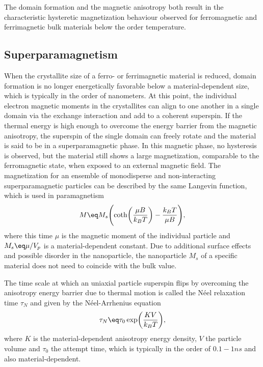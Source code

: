 \documentclass[\main/dresen_thesis.tex]{subfiles}
\begin{document}
    The domain formation and the magnetic anisotropy both result in the characteristic hysteretic magnetization behaviour observed for ferromagnetic and ferrimagnetic bulk materials below the order temperature.

  \subsection{Superparamagnetism}
    When the crystallite size of a ferro- or ferrimagnetic material is reduced, domain formation is no longer energetically favorable below a material-dependent size, which is typically in the order of nanometers.
    At this point, the individual electron magnetic moments in the crystallites can align to one another in a single domain via the exchange interaction and add to a coherent superspin.
    If the thermal energy is high enough to overcome the energy barrier from the magnetic anisotropy, the superspin of the single domain can freely rotate and the material is said to be in a superparamagnetic phase.
    In this magnetic phase, no hysteresis is observed, but the material still shows a large magnetization, comparable to the ferromagnetic state, when exposed to an external magnetic field.
    The magnetization for an ensemble of monodisperse and non-interacting superparamagnetic particles can be described by the same Langevin function, which is used in paramagnetism
    \begin{align}
      M \eq M_s \Biggl( \coth \biggl(\frac{\mu B}{k_B T} \biggr) - \frac{k_B T}{\mu B} \Biggr),
    \end{align}
    where this time $\mu$ is the magnetic moment of the individual particle and $M_s \eq \mu / V_p$ is a material-dependent constant.
    Due to additional surface effects and possible disorder in the nanoparticle, the nanoparticle $M_s$ of a specific material does not need to coincide with the bulk value.

    The time scale at which an uniaxial particle superspin flips by overcoming the anisotropy energy barrier due to thermal motion is called the N\'eel relaxation time $\tau_N$ and given by the N\'eel-Arrhenius equation
    \begin{align}
      \tau_N \eq \tau_0 \exp \biggl( \frac{KV}{k_B T} \biggr),
    \end{align}
    where $K$ is the material-dependent anisotropy energy density, $V$ the particle volume and $\tau_0$ the attempt time, which is typically in the order of $0.1 - 1 \unit{ns}$ and also material-dependent.
\end{document}
